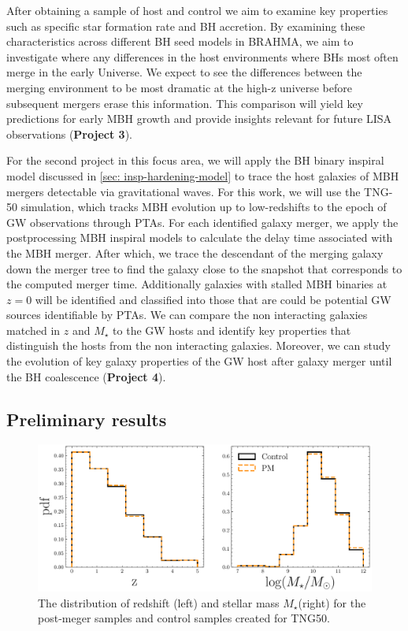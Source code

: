 \documentclass[11pt, letterpaper]{article}
\begin{document}
After obtaining a sample of host and control we aim to examine key properties such as specific  star formation rate and BH accretion. By examining these characteristics across different BH seed models in BRAHMA, we aim to investigate where any differences in the host environments where BHs most often merge in the early Universe. We expect to see the differences between the merging environment to be most dramatic at the high-z universe before subsequent mergers erase this information. This comparison will yield key predictions for early MBH growth and provide insights relevant for future LISA observations (\textbf{Project 3}).

For the second project in this focus area, we will apply the BH binary inspiral model discussed in \ref{sec: insp-hardening-model} to trace the host galaxies of MBH mergers detectable via gravitational waves. For this work, we will use the TNG-50 simulation, which tracks MBH evolution up to low-redshifts to the epoch of GW observations through PTAs. For each identified galaxy merger, we apply the postprocessing MBH inspiral models to calculate the delay time associated with the MBH merger. After which, we trace the descendant of the merging galaxy down the merger tree to find the galaxy close to the snapshot that corresponds to the computed merger time. Additionally galaxies with stalled MBH binaries at $z=0$ will be identified and classified into those that are could be potential GW sources identifiable by PTAs.  We can compare the  non interacting galaxies matched in $z$ and $M_{\star}$ to the GW hosts and identify key properties that distinguish the hosts from the non interacting galaxies. Moreover, we can study the evolution of key galaxy properties of the GW host after galaxy merger until the BH coalescence (\textbf{Project 4}). 

\subsection{Preliminary results}
   
\begin{figure}[!htb]
    \centering
    \includegraphics[width=0.8\linewidth]{fig/control-pm-z-Mstar-match.pdf}
    \caption{The distribution of redshift (left) and stellar mass $M_{\star}$(right) for the post-meger samples and control samples created for TNG50. }
    \label{fig:control-matching}
\end{figure}
\end{document}
